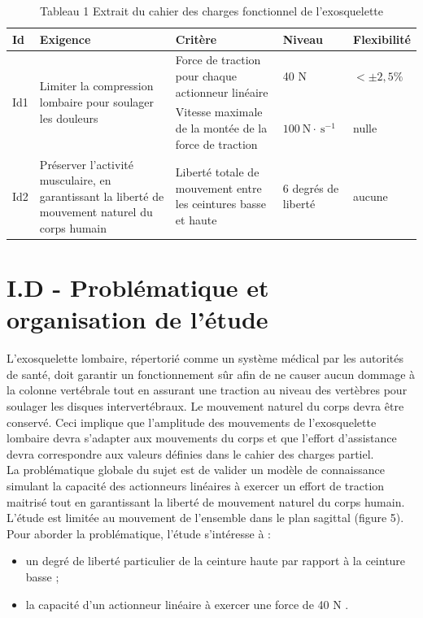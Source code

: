 \documentclass[10pt]{article}
\begin{document}
\begin{table}[h]
\begin{center}
\begin{tabular}{|l|l|l|l|l|}
\hline
Id & Exigence & Critère & Niveau & Flexibilité \\
\hline
\multirow[t]{2}{*}{Id1} & \multirow[t]{2}{*}{Limiter la compression lombaire pour soulager les douleurs} & Force de traction pour chaque actionneur linéaire & 40 N & $< \pm 2,5 \%$ \\
\hline
 &  & Vitesse maximale de la montée de la force de traction & $100 \mathrm{~N} \cdot \mathrm{~s}^{-1}$ & nulle \\
\hline
Id2 & Préserver l'activité musculaire, en garantissant la liberté de mouvement naturel du corps humain & Liberté totale de mouvement entre les ceintures basse et haute & 6 degrés de liberté & aucune \\
\hline
\end{tabular}
\captionsetup{labelformat=empty}
\caption{Tableau 1 Extrait du cahier des charges fonctionnel de l'exosquelette}
\end{center}
\end{table}

\section{I.D - Problématique et organisation de l'étude}
L'exosquelette lombaire, répertorié comme un système médical par les autorités de santé, doit garantir un fonctionnement sûr afin de ne causer aucun dommage à la colonne vertébrale tout en assurant une traction au niveau des vertèbres pour soulager les disques intervertébraux. Le mouvement naturel du corps devra être conservé. Ceci implique que l'amplitude des mouvements de l'exosquelette lombaire devra s'adapter aux mouvements du corps et que l'effort d'assistance devra correspondre aux valeurs définies dans le cahier des charges partiel.\\
La problématique globale du sujet est de valider un modèle de connaissance simulant la capacité des actionneurs linéaires à exercer un effort de traction maitrisé tout en garantissant la liberté de mouvement naturel du corps humain.\\
L'étude est limitée au mouvement de l'ensemble dans le plan sagittal (figure 5). Pour aborder la problématique, l'étude s'intéresse à :

\begin{itemize}
  \item un degré de liberté particulier de la ceinture haute par rapport à la ceinture basse ;
  \item la capacité d'un actionneur linéaire à exercer une force de 40 N .
\end{itemize}
\end{document}
